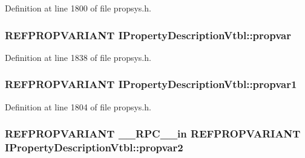 Definition at line 1800 of file propsys.\+h.

\subsubsection[{\texorpdfstring{propvar}{propvar}}]{ {\bf R\+E\+F\+P\+R\+O\+P\+V\+A\+R\+I\+A\+NT} I\+Property\+Description\+Vtbl\+::propvar}\hypertarget{struct_i_property_description_vtbl_a7f6802b2f978a31992685c2d6b41f06c}{}\label{struct_i_property_description_vtbl_a7f6802b2f978a31992685c2d6b41f06c}


Definition at line 1838 of file propsys.\+h.

\subsubsection[{\texorpdfstring{propvar1}{propvar1}}]{ {\bf R\+E\+F\+P\+R\+O\+P\+V\+A\+R\+I\+A\+NT} I\+Property\+Description\+Vtbl\+::propvar1}\hypertarget{struct_i_property_description_vtbl_a03dc2b8ea897b0ad83fa3b7478a144f5}{}\label{struct_i_property_description_vtbl_a03dc2b8ea897b0ad83fa3b7478a144f5}


Definition at line 1804 of file propsys.\+h.

\subsubsection[{\texorpdfstring{propvar2}{propvar2}}]{ {\bf R\+E\+F\+P\+R\+O\+P\+V\+A\+R\+I\+A\+NT} {\bf \+\_\+\+\_\+\+R\+P\+C\+\_\+\+\_\+in} {\bf R\+E\+F\+P\+R\+O\+P\+V\+A\+R\+I\+A\+NT} I\+Property\+Description\+Vtbl\+::propvar2}\hypertarget{struct_i_property_description_vtbl_af2377b10029c28a65223f500dcb219d0}{}\label{struct_i_property_description_vtbl_af2377b10029c28a65223f500dcb219d0}


